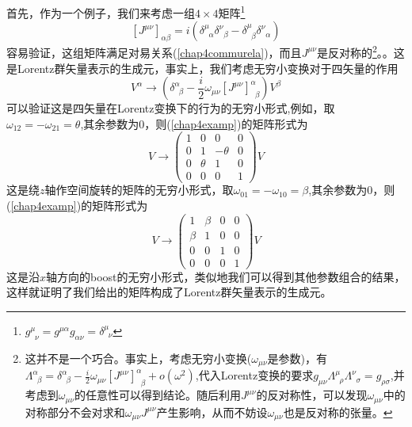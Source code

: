首先，作为一个例子，我们来考虑一组$4\times4$矩阵\footnote{$g^{\mu}_{\;\;\nu}=g^{\mu\alpha}g_{\alpha\nu}=\delta^{\mu}_{\;\;\nu}$}
\begin{equation}
\label{chap4vectorgene}
    \left[J^{\mu\nu}\right]_{\alpha\beta}=i\left(\delta^{\mu}_{\;\;\alpha}\delta^{\nu}_{\;\;\beta}-\delta^{\mu}_{\;\;\beta}\delta^{\nu}_{\;\;\alpha}\right)
\end{equation}
容易验证，这组矩阵满足对易关系(\ref{chap4commurela})，而且$J^{\mu\nu}$是反对称的\footnote{这并不是一个巧合。事实上，考虑无穷小变换($\omega_{\mu\nu}$是参数)，有$\Lambda^{\alpha}_{\;\;\beta}=\delta^{\alpha}_{\;\;\beta}-\frac{i}{2}\omega_{\mu\nu}\left[J^{\mu\nu}\right]^{\alpha}_{\;\;\beta}+o(\omega^{2})$,代入Lorentz变换的要求$ g_{\mu\nu}\Lambda^{\mu}_{\;\;\rho}\Lambda^{\nu}_{\;\;\sigma}=g_{\rho\sigma}$,并考虑到$\omega_{\mu\nu}$的任意性可以得到结论。随后利用$J^{\mu\nu}$的反对称性，可以发现$\omega_{\mu\nu}$中的对称部分不会对求和$\omega_{\mu\nu}J^{\mu\nu}$产生影响，从而不妨设$\omega_{\mu\nu}$也是反对称的张量。}。。这是Lorentz群矢量表示的生成元，事实上，我们考虑无穷小变换对于四矢量的作用
\begin{equation}
\label{chap4examp}
    V^{\alpha}\longrightarrow \left(\delta^{\alpha}_{\;\;\beta}-\frac{i}{2}\omega_{\mu\nu}\left[J^{\mu\nu}\right]^{\alpha}_{\;\;\beta}\right)V^{\beta}
\end{equation}
可以验证这是四矢量在Lorentz变换下的行为的无穷小形式,例如，取$\omega_{12}=-\omega_{21}=\theta$,其余参数为0，则(\ref{chap4examp})的矩阵形式为
\begin{equation}
    V\longrightarrow \left(\begin{array}{cccc}
        1&0 &0 &0 \\
          0&1 &-\theta &0\\
           0&\theta &1 &0\\
            0&0 &0 &1
    \end{array}\right)V
\end{equation}
这是绕$z$轴作空间旋转的矩阵的无穷小形式，取$\omega_{01}=-\omega_{10}=\beta$,其余参数为0，则(\ref{chap4examp})的矩阵形式为
\begin{equation}
    V\longrightarrow \left(\begin{array}{cccc}
        1&\beta &0 &0 \\
          \beta&1 &0 &0\\
           0&0 &1 &0\\
            0&0 &0 &1
    \end{array}\right)V
\end{equation}
这是沿$x$轴方向的boost的无穷小形式，类似地我们可以得到其他参数组合的结果，这样就证明了我们给出的矩阵构成了Lorentz群矢量表示的生成元。

